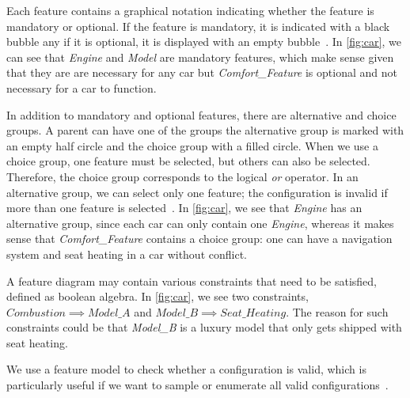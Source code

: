 Each feature contains a graphical notation indicating whether the feature is mandatory or optional. 
If the feature is mandatory, it is indicated with a black bubble any if it is optional, it is displayed with an empty bubble~\cite{Feature-Oriented-Software-Product-Lines-Feature-models}. 
In \autoref{fig:car}, we can see that \textit{Engine} and \textit{Model} are mandatory features, which make sense given that they are are necessary for any car 
but \textit{Comfort\_Feature} is optional and not necessary for a car to function.

In addition to mandatory and optional features, there are alternative and choice groups. 
A parent can have one of the groups the alternative group is marked with an empty half circle and the choice group with a filled circle. 
When we use a choice group, one feature must be selected, but others can also be selected. Therefore, the choice group corresponds to the logical \textit{or} operator. 
In an alternative group, we can select only one feature; the configuration is invalid if more than one feature is selected~\cite{Feature-Oriented-Software-Product-Lines-Feature-models}. 
In \autoref{fig:car}, we see that \textit{Engine} has an alternative group, since each car can only contain one \textit{Engine}, 
whereas it makes sense that \textit{Comfort\_Feature} contains a choice group: one can have a navigation system and seat heating in a car without conflict.

A feature diagram may contain various constraints that need to be satisfied, defined as boolean algebra. In \autoref{fig:car}, we see two constraints, 
$Combustion \implies Model\_A$ and $Model\_B \implies Seat\_Heating$. The reason for such constraints could be that \textit{Model\_B} 
is a luxury model that only gets shipped with seat heating.

We use a feature model to check whether a configuration 
is valid, which is particularly useful if we want to sample or enumerate all valid configurations~\cite{Feature-Oriented-Software-Product-Lines-Feature-models}. 
